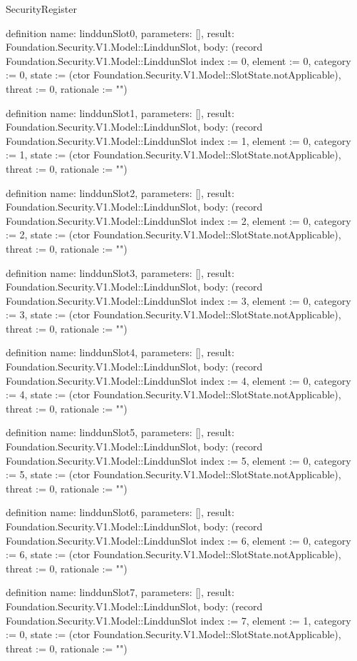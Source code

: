 \begin{lexlean}{SecurityRegister}
\begin{semanticmodule}
definition{
  name: linddunSlot0,
  parameters: [],
  result: Foundation.Security.V1.Model::LinddunSlot,
  body: (record Foundation.Security.V1.Model::LinddunSlot {index := 0, element := 0, category := 0, state := (ctor Foundation.Security.V1.Model::SlotState.notApplicable), threat := 0, rationale := ""})
}

definition{
  name: linddunSlot1,
  parameters: [],
  result: Foundation.Security.V1.Model::LinddunSlot,
  body: (record Foundation.Security.V1.Model::LinddunSlot {index := 1, element := 0, category := 1, state := (ctor Foundation.Security.V1.Model::SlotState.notApplicable), threat := 0, rationale := ""})
}

definition{
  name: linddunSlot2,
  parameters: [],
  result: Foundation.Security.V1.Model::LinddunSlot,
  body: (record Foundation.Security.V1.Model::LinddunSlot {index := 2, element := 0, category := 2, state := (ctor Foundation.Security.V1.Model::SlotState.notApplicable), threat := 0, rationale := ""})
}

definition{
  name: linddunSlot3,
  parameters: [],
  result: Foundation.Security.V1.Model::LinddunSlot,
  body: (record Foundation.Security.V1.Model::LinddunSlot {index := 3, element := 0, category := 3, state := (ctor Foundation.Security.V1.Model::SlotState.notApplicable), threat := 0, rationale := ""})
}

definition{
  name: linddunSlot4,
  parameters: [],
  result: Foundation.Security.V1.Model::LinddunSlot,
  body: (record Foundation.Security.V1.Model::LinddunSlot {index := 4, element := 0, category := 4, state := (ctor Foundation.Security.V1.Model::SlotState.notApplicable), threat := 0, rationale := ""})
}

definition{
  name: linddunSlot5,
  parameters: [],
  result: Foundation.Security.V1.Model::LinddunSlot,
  body: (record Foundation.Security.V1.Model::LinddunSlot {index := 5, element := 0, category := 5, state := (ctor Foundation.Security.V1.Model::SlotState.notApplicable), threat := 0, rationale := ""})
}

definition{
  name: linddunSlot6,
  parameters: [],
  result: Foundation.Security.V1.Model::LinddunSlot,
  body: (record Foundation.Security.V1.Model::LinddunSlot {index := 6, element := 0, category := 6, state := (ctor Foundation.Security.V1.Model::SlotState.notApplicable), threat := 0, rationale := ""})
}

definition{
  name: linddunSlot7,
  parameters: [],
  result: Foundation.Security.V1.Model::LinddunSlot,
  body: (record Foundation.Security.V1.Model::LinddunSlot {index := 7, element := 1, category := 0, state := (ctor Foundation.Security.V1.Model::SlotState.notApplicable), threat := 0, rationale := ""})
}


\end{semanticmodule}
\end{lexlean}
